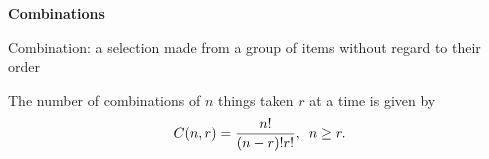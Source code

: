 \begin{center}
\textbf{Combinations}
\end{center}

\vspace*{1ex}

Combination: a selection made from a group of items without regard to their order

\vspce 

The number of combinations of $n$ things taken $r$ at a time is given by
\[
C(n, r) = \displaystyle \frac{n!}{(n-r)!r!}, \hspace*{0.5em} n\geq r. 
\]